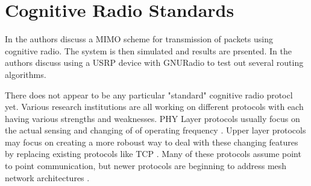 \section{Cognitive Radio Standards}
In \cite{7124942} the authors discuss a MIMO scheme for transmission of packets using cognitive radio. The system is then simulated and results are prsented. 
In \cite{5784217} the authors discuss using a USRP device with GNURadio to test out several routing algorithms.  

There does not appear to be any particular "standard" cognitive radio protocl yet. Various research
institutions are all working on different protocols with each having various strengths and weaknesses.
PHY Layer protocols usually focus on the actual sensing and changing of of operating frequency 
\cite{6730802}. Upper layer protocols may focus on creating a more roboust way to deal with these 
changing features by replacing existing protocols like TCP \cite{5062176} \cite{6504070}. 
Many of these protocols assume point to point communication, but newer protocols are 
beginning to address mesh network architectures \cite{5738222}.  

